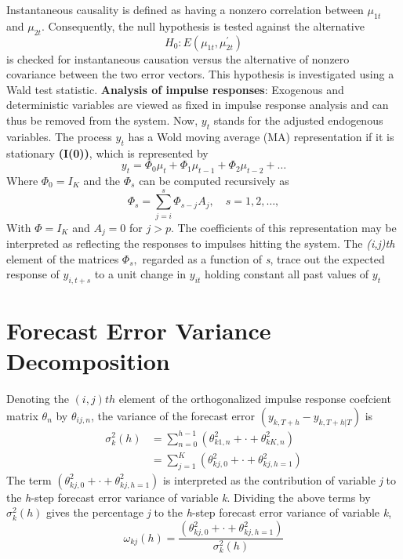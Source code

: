 Instantaneous causality is defined as having a nonzero correlation between $\mu_{1t}$ and $\mu_{2t}$. Consequently, the null hypothesis is tested against the alternative 
\begin{equation}
	H_{0}: E\left(\mu_{1t},\mu_{2t}^{'} \right)
\end{equation}
is checked for instantaneous causation versus the alternative of nonzero covariance between the two error vectors. This hypothesis is investigated using a Wald test statistic.
\textbf{Analysis of impulse responses}: Exogenous and deterministic variables are viewed as fixed in impulse response analysis and can thus be removed from the system. Now, $y_{t}$ stands for the adjusted endogenous variables. The process $y_{t}$ has a Wold moving average (MA) representation if it is stationary \textbf{(I(0))}, which is represented by 
\begin{equation}
	y_{t} = \varPhi_{0}\mu_{t} + \varPhi_{1}\mu_{t-1} + \varPhi_{2}\mu_{t-2} + \dots
\end{equation}
Where $\varPhi_{0} =I_{K}$ and the $\varPhi_{s}$ can be computed recursively as 
\begin{equation}
	\varPhi_{s} = \sum_{j=i}^{s}\varPhi_{s-j}A_{j}, \quad s = 1,2,\dots,
\end{equation}
With $\varPhi = I_{K}$ and $A_{j} = 0 $ for $j>p$. The coefficients of this
representation may be interpreted as reflecting the responses
to impulses hitting the system. The \emph{(i,j)th} element of the matrices $\varPhi_{s},$ regarded as a function of \emph{s}, trace out the expected
response of $y_{i,t+s}$ to a unit change in $y_{it}$ holding constant all
past values of $y_{t}$
\section{ Forecast Error Variance Decomposition}
Denoting the $(i,j)th$ element of the orthogonalized impulse response
coefcient matrix $\theta_{n}$ by $\theta_{ij,n}$, the variance of the forecast error $\left(y_{k,T+h}-y_{k,T+h|T}\right)$ is 
\begin{equation}
	\begin{split}
		\displaystyle
		\sigma^{2}_{k}(h) & = \sum^{h-1}_{n=0}\left(\theta^{2}_{k1,n} + \cdot+ \theta^{2}_{kK,n}\right) \\
		& =\sum^{K}_{j=1}\left(\theta^{2}_{kj,0} + \cdot+ \theta^{2}_{kj,h=1}\right)
	\end{split}
\end{equation}
The term $\displaystyle \left(\theta^{2}_{kj,0} + \cdot+ \theta^{2}_{kj,h=1}\right) $ is interpreted as the contribution
of variable \emph{j} to the \emph{h}-step forecast error variance of variable
\emph{k}.  Dividing the above terms by $\displaystyle \sigma^{2}_{k}(h)$ gives the percentage \emph{j} to the \emph{h}-step forecast error variance of variable
\emph{k}, 
\begin{equation}
	\omega_{kj}(h) =\frac{\left(\theta^{2}_{kj,0} + \cdot+ \theta^{2}_{kj,h=1}\right)}{\sigma^{2}_{k}(h)}
\end{equation}
